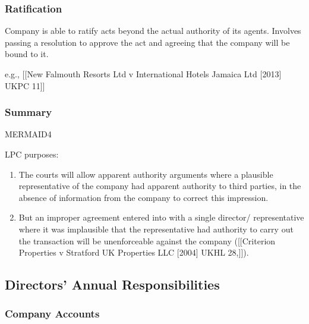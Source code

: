 \documentclass[
]{article}
\providecommand{\tightlist}{%
  \setlength{\itemsep}{0pt}\setlength{\parskip}{0pt}}
\begin{document}
\hypertarget{ratification-1}{%
\subsubsection{Ratification}\label{ratification-1}}

Company is able to ratify acts beyond the actual authority of its
agents. Involves passing a resolution to approve the act and agreeing
that the company will be bound to it.

e.g., {[}{[}New Falmouth Resorts Ltd v International Hotels Jamaica Ltd
{[}2013{]} UKPC 11{]}{]}

\hypertarget{summary}{%
\subsubsection{Summary}\label{summary}}

MERMAID4

LPC purposes:

\begin{enumerate}
\def\labelenumi{\arabic{enumi}.}
\tightlist
\item
  The courts will allow apparent authority arguments where a plausible
  representative of the company had apparent authority to third parties,
  in the absence of information from the company to correct this
  impression.
\item
  But an improper agreement entered into with a single director/
  representative where it was implausible that the representative had
  authority to carry out the transaction will be unenforceable against
  the company ({[}{[}Criterion Properties v Stratford UK Properties LLC
  {[}2004{]} UKHL 28,{]}{]}).
\end{enumerate}

\hypertarget{directors-annual-responsibilities}{%
\subsection{Directors' Annual
Responsibilities}\label{directors-annual-responsibilities}}

\hypertarget{company-accounts}{%
\subsubsection{Company Accounts}\label{company-accounts}}
\end{document}
